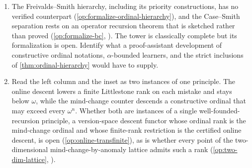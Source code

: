 \begin{enumerate}[leftmargin=*,itemsep=3pt]
\item The Freivalds--Smith hierarchy, including its priority constructions, has no verified counterpart (\cref{op:formalize-ordinal-hierarchy}), and the Case--Smith separation rests on an operator recursion theorem that is sketched rather than proved (\cref{op:formalize-bc}, \cite{CaseSmith1983}). The tower is classically complete but its formalization is open. Identify what a proof-assistant development of constructive ordinal notations, $\alpha$-bounded learners, and the strict inclusions of \cref{thm:ordinal-hierarchy} would have to supply.

\item Read the left column and the inset as two instances of one principle. The online descent lowers a finite Littlestone rank on each mistake and stays below $\omega$, while the mind-change counter descends a constructive ordinal that may exceed every $\omega^n$. Whether both are instances of a single well-founded-recursion principle, a version-space descent functor whose ordinal rank is the mind-change ordinal and whose finite-rank restriction is the certified online descent, is open (\cref{op:online-transfinite}), as is whether every point of the two-dimensional mind-change-by-anomaly lattice admits such a rank (\cref{op:two-dim-lattice}, \cite{SharmaStephanVentsov2004}).
\end{enumerate}
